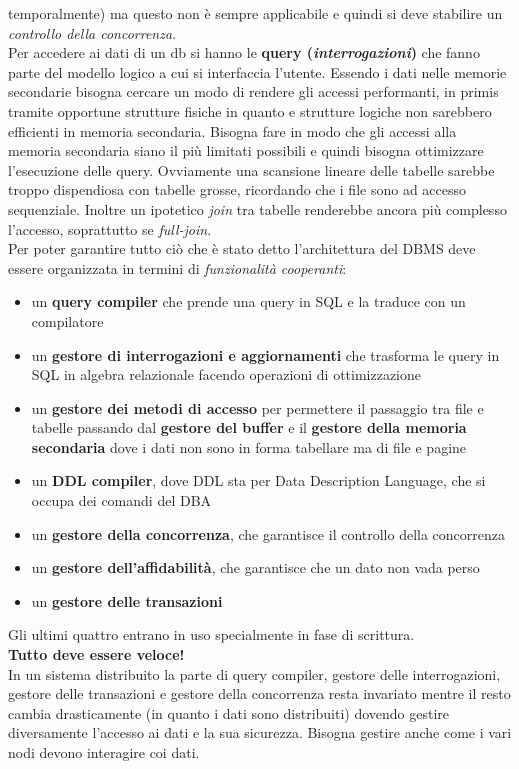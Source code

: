\documentclass[a4paper,12pt, oneside]{book}
\begin{document}
temporalmente) ma questo non è sempre applicabile e quindi si deve stabilire un
\textit{controllo della concorrenza}.\\
Per accedere ai dati di un db si hanno le \textbf{query
  (\textit{interrogazioni})} che fanno parte del modello logico a cui si
interfaccia l'utente. Essendo i dati nelle memorie secondarie bisogna cercare un
modo di rendere gli accessi performanti, in primis tramite opportune strutture
fisiche in quanto e strutture logiche non sarebbero efficienti in memoria
secondaria. Bisogna fare in modo che gli accessi alla memoria secondaria siano
il più limitati possibili e quindi bisogna ottimizzare l'esecuzione delle query.
Ovviamente una scansione lineare delle tabelle sarebbe troppo dispendiosa con
tabelle grosse, ricordando che i file sono ad accesso sequenziale. Inoltre un
ipotetico \textit{join} tra tabelle renderebbe ancora più complesso l'accesso,
soprattutto se \textit{full-join}.\\
Per poter garantire tutto ciò che è stato detto l'architettura del DBMS deve
essere organizzata in termini di \textit{funzionalità cooperanti}:
\begin{itemize}
  \item un \textbf{query compiler} che prende una query in SQL e la traduce con
  un compilatore
  \item un \textbf{gestore di interrogazioni e aggiornamenti} che trasforma le
  query in SQL in algebra relazionale facendo operazioni di ottimizzazione
  \item un \textbf{gestore dei metodi di accesso} per permettere il passaggio
  tra file e tabelle passando dal \textbf{gestore del buffer} e il
  \textbf{gestore della memoria secondaria} dove i dati non sono in forma
  tabellare ma di file e pagine
  \item un \textbf{DDL compiler}, dove DDL sta per Data Description Language,
  che si occupa dei comandi del DBA
  \item un \textbf{gestore della concorrenza}, che garantisce il controllo della
  concorrenza
  \item un \textbf{gestore dell'affidabilità}, che garantisce che un dato non
  vada perso
  \item un \textbf{gestore delle transazioni}
\end{itemize}
Gli ultimi quattro entrano in uso specialmente in fase di scrittura.\\
\textbf{Tutto deve essere veloce!}\\
In un sistema distribuito la parte di query compiler, gestore delle
interrogazioni, gestore delle transazioni e gestore della concorrenza resta
invariato mentre il resto cambia drasticamente (in quanto i dati sono
distribuiti) dovendo gestire diversamente l'accesso ai dati e la sua
sicurezza. Bisogna gestire anche come i vari nodi devono interagire coi dati.
\end{document}
